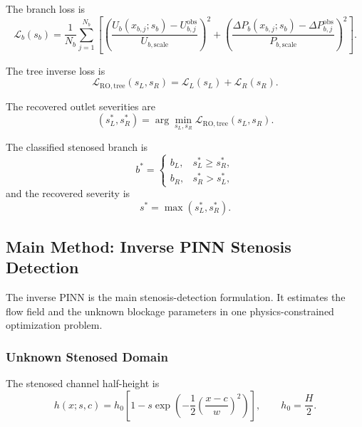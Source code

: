 \documentclass[11pt]{article}
\begin{document}
The branch loss is
\begin{equation}
    \mathcal{L}_b(s_b)
    =
    \frac{1}{N_b}
    \sum_{j=1}^{N_b}
    \left[
        \left(
            \frac{U_b(x_{b,j};s_b)-U_{b,j}^{\mathrm{obs}}}
            {U_{b,\mathrm{scale}}}
        \right)^2
        +
        \left(
            \frac{\Delta P_b(x_{b,j};s_b)-\Delta P_{b,j}^{\mathrm{obs}}}
            {P_{b,\mathrm{scale}}}
        \right)^2
    \right].
\end{equation}

The tree inverse loss is
\begin{equation}
    \mathcal{L}_{\mathrm{RO,tree}}(s_L,s_R)
    =
    \mathcal{L}_L(s_L)+\mathcal{L}_R(s_R).
\end{equation}

The recovered outlet severities are
\begin{equation}
    (s_L^{\ast},s_R^{\ast})
    =
    \arg\min_{s_L,s_R}
    \mathcal{L}_{\mathrm{RO,tree}}(s_L,s_R).
\end{equation}

The classified stenosed branch is
\begin{equation}
    b^{\ast}
    =
    \begin{cases}
        b_L, & s_L^{\ast}\ge s_R^{\ast},\\
        b_R, & s_R^{\ast}>s_L^{\ast},
    \end{cases}
\end{equation}
and the recovered severity is
\begin{equation}
    s^{\ast}=\max(s_L^{\ast},s_R^{\ast}).
\end{equation}

\subsection{Main Method: Inverse PINN Stenosis Detection}

The inverse PINN is the main stenosis-detection formulation. It estimates the flow field and the unknown blockage parameters in one physics-constrained optimization problem.

\subsubsection{Unknown Stenosed Domain}

The stenosed channel half-height is
\begin{equation}
    h(x;s,c)
    =
    h_0
    \left[
        1
        -
        s
        \exp
        \left(
            -\frac{1}{2}
            \left(
                \frac{x-c}{w}
            \right)^2
        \right)
    \right],
    \qquad
    h_0=\frac{H}{2}.
    \label{eq:inverse_height}
\end{equation}
\end{document}
